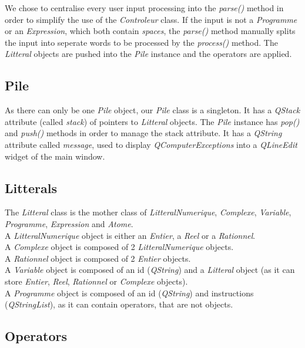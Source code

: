 \documentclass[titlepage]{article}
\begin{document}
    We chose to centralise every user input processing into the \textit{parse()} method in order to simplify the use of the \textit{Controleur} class. If the input is not a \textit{Programme} or an \textit{Expression}, which both contain \textit{spaces}, the \textit{parse()} method manually splits the input into seperate words to be processed by the \textit{process()} method. The \textit{Litteral} objects are pushed into the \textit{Pile} instance and the operators are applied.

    \subsection{Pile}

    As there can only be one \textit{Pile} object, our \textit{Pile} class is a singleton. It has a \textit{QStack} attribute (called \textit{stack}) of pointers to \textit{Litteral} objects. The \textit{Pile} instance has \textit{pop()} and \textit{push()} methods in order to manage the stack attribute. It has a \textit{QString} attribute called \textit{message}, used to display \textit{QComputerExceptions} into a \textit{QLineEdit} widget of the main window.

    \subsection{Litterals}

    The \textit{Litteral} class is the mother class of \textit{LitteralNumerique}, \textit{Complexe}, \textit{Variable}, \textit{Programme}, \textit{Expression} and \textit{Atome}.\\
    A \textit{LitteralNumerique} object is either an \textit{Entier}, a \textit{Reel} or a \textit{Rationnel}. \\
    A \textit{Complexe} object is composed of 2 \textit{LitteralNumerique} objects.\\
    A \textit{Rationnel} object is composed of 2 \textit{Entier} objects.\\
    A \textit{Variable} object is composed of an id (\textit{QString}) and a \textit{Litteral} object (as it can store \textit{Entier}, \textit{Reel}, \textit{Rationnel} or \textit{Complexe} objects).\\
    A \textit{Programme} object is composed of an id (\textit{QString}) and instructions (\textit{QStringList}), as it can contain operators, that are not objects.

    \subsection{Operators}
\end{document}
